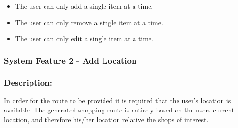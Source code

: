 \documentclass[10pt,twocolumn]{witseiepaper}
\begin{document}
		\begin{itemize}
			\item The user can only add a single item at a time.
			\item The user can only remove a single item at a time.
			\item The user can only edit a single item at a time.
		\end{itemize}
		
		
		\subsubsection{System Feature 2 - Add Location}
		
		\subsubsection*{Description:}
		
		In order for the route to be provided it is required that the user's location is available. The generated shopping route is entirely based on the users current location, and therefore his/her location relative the shops of interest. 
		
\end{document}
